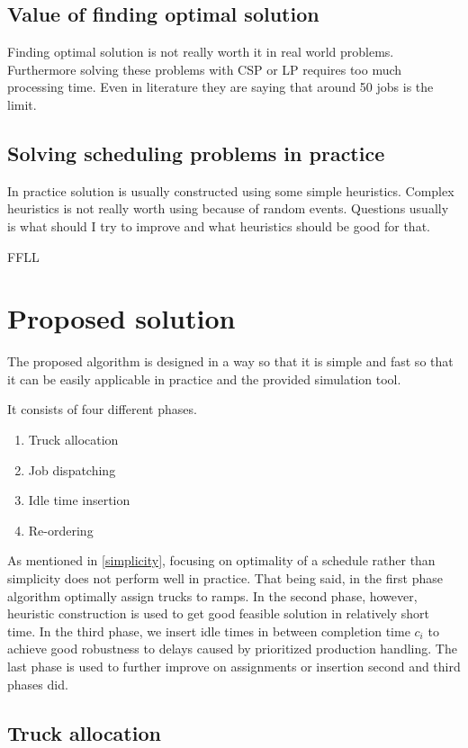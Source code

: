 \documentclass{ctuthesis}
\begin{document}
\section{Value of finding optimal solution}
Finding optimal solution is not really worth it in real world problems. Furthermore solving these problems with CSP or LP requires too much processing time. Even in literature they are saying that around 50 jobs is the limit. 
\section{Solving scheduling problems in practice}
In practice solution is usually constructed using some simple heuristics. Complex heuristics is not really worth using because of random events. Questions usually is what should I try to improve and what heuristics should be good for that. 

FFLL 
\chapter{Proposed solution}
\label{ch:Proposed solution}

The proposed algorithm is designed in a way so that it is simple and fast so that it can be easily applicable in practice and the provided simulation tool.

It consists of four different phases.

\begin{enumerate}
    \item Truck allocation
    \item Job dispatching
    \item Idle time insertion
    \item Re-ordering
\end{enumerate}

As mentioned in \ref{simplicity}, focusing on optimality of a schedule rather than simplicity does not perform well in practice. That being said, in the first phase algorithm optimally assign trucks to ramps. In the second phase, however, heuristic construction is used to get good feasible solution in relatively short time. In the third phase, we insert idle times in between completion time $c_i$ to achieve good robustness to delays caused by prioritized production handling. The last phase is used to further improve on assignments or insertion second and third phases did.

\section{Truck allocation}
\end{document}
